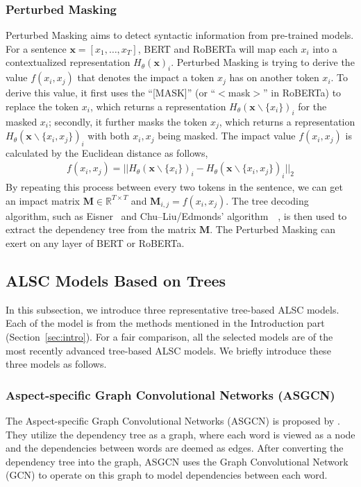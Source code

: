 \documentclass[11pt]{article}
\begin{document}
\subsubsection{Perturbed Masking}
Perturbed Masking aims to detect syntactic information from pre-trained  models.
For a sentence $\mathbf{x}=[x_1, \ldots, x_T]$, BERT and RoBERTa will map each $x_i$ into a contextualized representation $H_{\theta}(\mathbf{x})_i$. Perturbed Masking is trying to derive the value $f(x_i, x_j)$ that denotes the impact a token $x_j$ has on another token $x_i$. To derive this value, it first uses the ``[MASK]'' (or ``$<$mask$>$'' in RoBERTa) to replace the token $x_i$, which returns a representation $H_{\theta}(\mathbf{x} \backslash \{x_i\})_i$ for the masked $x_i$; secondly, it further masks the token $x_j$, which returns a representation $H_{\theta}(\mathbf{x} \backslash \{x_i,x_j\})_i$ with both $x_i,x_j$ being masked. The impact value $f(x_i, x_j)$ is calculated by the Euclidean distance as follows,
\begin{align}
  f\!(\!x_i, \!x_j\!) \!=\! ||\! H_{\theta}(\mathbf{x} \backslash \{x_i\})_i \!-\! H_{\theta}(\mathbf{x} \backslash \!\{\!x_i, \!x_j\!\})_i||_2  \end{align}
By repeating this process between every two tokens in the sentence, we can get an impact matrix $\mathbf{M} \in \mathbb{R}^{T \times T}$ and $\mathbf{M}_{i,j} = f(x_i, x_j)$. The tree decoding algorithm, such as Eisner~\citep{DBLP:conf/coling/Eisner96} and Chu–Liu/Edmonds' algorithm~{~\citep{1965On,edmonds1967optimum}},  is then used to extract the dependency tree from the matrix $\mathbf{M}$.  The  Perturbed Masking  can exert on any layer of BERT or RoBERTa.


\subsection{ALSC Models Based on Trees}
\label{sec:ALSC_models}
In this subsection, we introduce three representative tree-based ALSC models. Each of the model is from the  methods mentioned in the Introduction part (Section~\ref{sec:intro}). For a fair comparison, all the selected models are of the most recently advanced tree-based ALSC models.
We briefly introduce these three models as follows.


\subsubsection{Aspect-specific Graph Convolutional Networks (ASGCN)}
The Aspect-specific Graph Convolutional Networks (ASGCN) is proposed by \citet{DBLP:conf/emnlp/SunZMML19}. They utilize the dependency tree as a graph, where each word is viewed as a node and the dependencies between words are deemed as edges. After converting the dependency tree into the graph, ASGCN uses the Graph Convolutional Network (GCN) to operate on this graph to model dependencies between each word.
\end{document}
